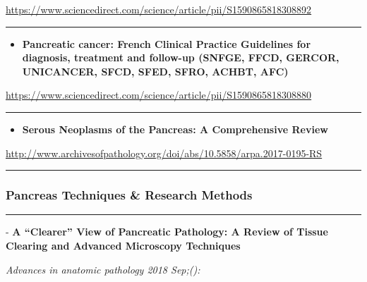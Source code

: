 \documentclass[]{article}
\providecommand{\tightlist}{%
  \setlength{\itemsep}{0pt}\setlength{\parskip}{0pt}}
\begin{document}
\url{https://www.sciencedirect.com/science/article/pii/S1590865818308892}

\begin{center}\rule{0.5\linewidth}{\linethickness}\end{center}

\begin{itemize}
\tightlist
\item
  \textbf{Pancreatic cancer: French Clinical Practice Guidelines for
  diagnosis, treatment and follow-up (SNFGE, FFCD, GERCOR, UNICANCER,
  SFCD, SFED, SFRO, ACHBT, AFC)}
\end{itemize}

\url{https://www.sciencedirect.com/science/article/pii/S1590865818308880}

\begin{center}\rule{0.5\linewidth}{\linethickness}\end{center}

\begin{itemize}
\tightlist
\item
  \textbf{Serous Neoplasms of the Pancreas: A Comprehensive Review}
\end{itemize}

\url{http://www.archivesofpathology.org/doi/abs/10.5858/arpa.2017-0195-RS}

\begin{center}\rule{0.5\linewidth}{\linethickness}\end{center}

\hypertarget{pancreas-techniques-research-methods}{%
\subsubsection{Pancreas Techniques \& Research
Methods}\label{pancreas-techniques-research-methods}}

\begin{center}\rule{0.5\linewidth}{\linethickness}\end{center}

 - \textbf{A ``Clearer'' View of Pancreatic Pathology: A Review of
Tissue Clearing and Advanced Microscopy Techniques}

\emph{Advances in anatomic pathology 2018 Sep;():}
\end{document}
